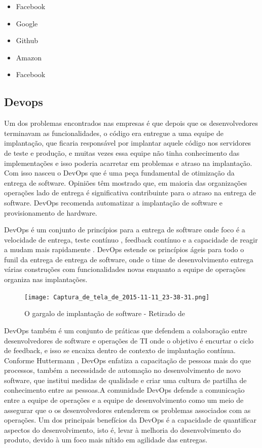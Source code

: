 \documentclass[12pt]{article}
\begin{document}
\begin{itemize}
  \item Facebook
    \item Google
  \item Github
    \item Amazon
    \item Facebook
\end{itemize}

\subsection{Devops} \label{sec2:sub1}

Um dos problemas encontrados nas empresas é que depois que os desenvolvedores terminavam as funcionalidades, o código era entregue a uma equipe de implantação, que ficaria responsável por implantar aquele código nos servidores de teste e produção, e muitas vezes essa equipe não tinha conhecimento das implementações e isso poderia acarretar em problemas e atraso na implantação. Com isso nasceu o DevOps que é uma peça fundamental de otimização da entrega de software. Opiniões têm mostrado que, em maioria das organizações operações lado de entrega é significativa contribuinte para o atraso na entrega de software. DevOps recomenda automatizar a implantação de software e provisionamento de hardware. \cite{7173368}

DevOps é um conjunto de princípios para a entrega de software onde foco é a velocidade de entrega, teste contínuo , feedback contínuo e a capacidade de reagir a mudam mais rapidamente \cite{7173368}. DevOps estende os princípios ágeis para todo o funil da entrega de entrega de software, onde o time de desenvolvimento entrega várias construções com funcionalidades novas enquanto a equipe de operações organiza nas implantações.

\begin{figure}[ht]
\centering
\texttt{[image: Captura\_de\_tela\_de\_2015-11-11\_23-38-31.png]}
\caption{O gargalo de implantação de software - Retirado de \cite{7173368}}
\label{fig:exampleFig1}
\end{figure}

DevOps também é um conjunto de práticas que defendem a colaboração entre desenvolvedores de software e operações de TI onde o objetivo é
encurtar o ciclo de feedback, e isso se encaixa dentro de contexto de implantação contínua. Conforme Huttermann \cite{httermann2012devops}, DevOps enfatiza a capacitação de pessoas mais do que processos, também a necessidade de automação no desenvolvimento de novo software, que institui medidas de qualidade e criar uma cultura de partilha de conhecimento entre as pessoas.A comunidade DevOps defende a comunicação entre a equipe de operações e a equipe de desenvolvimento como um meio de assegurar que o os desenvolvedores entenderem os problemas associados com as operações. Um dos principais benefícios da DevOps é a capacidade de quantificar aspectos do desenvolvimento, isto é, levar à melhoria do desenvolvimento do produto, devido à um foco mais nítido em agilidade das entregas.
\end{document}
